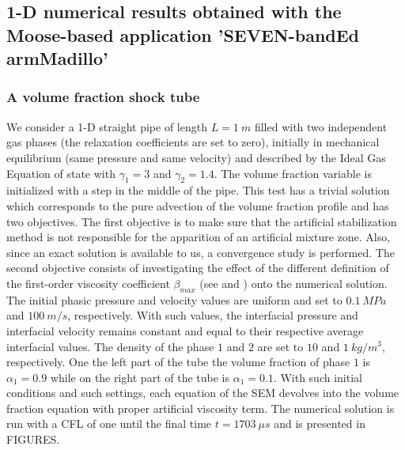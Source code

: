 \documentclass[preprint,10pt]{elsarticle}
\begin{document}
\subsection{1-D numerical results obtained with the Moose-based application 'SEVEN-bandEd armMadillo'}\label{sec:1d-results-sba}
%
\subsubsection{A volume fraction shock tube}\label{sec:vf-advection-test}
%
We consider a 1-D straight pipe of length $L=1 \ m$ filled with two independent gas phases (the relaxation coefficients are set to zero), initially in mechanical 
equilibrium (same pressure and same velocity) and described by the Ideal Gas Equation of state with $\gamma_1 = 3$ and $\gamma_2 = 1.4$. The volume 
fraction variable is initialized with a step in the middle of the pipe. This test has a trivial solution which corresponds to the pure advection of the volume fraction 
profile and has two objectives. The first objective is to make sure that the artificial stabilization method is not responsible for the apparition of an artificial 
mixture zone. Also, since an exact solution is available to us, a convergence study is performed. The second objective consists of investigating the effect of the 
different definition of the first-order viscosity coefficient $\beta_{max}$ (see  and ) onto the numerical 
solution.
The initial phasic pressure and velocity values are uniform and set to $0.1 \ MPa$ and $100 \ m/s$, respectively. With such values, the interfacial pressure and 
interfacial velocity remains constant and equal to their respective average interfacial values. The density of the phase $1$ and $2$ are set to $10$ and $1 \ kg/
m^3$, respectively. One the left part of the tube the volume fraction of phase $1$ is $\alpha_1 = 0.9$ while on the right part of the tube is $\alpha_1=0.1$. With 
such initial conditions and such settings, each equation of the SEM devolves into the volume fraction equation with proper artificial viscosity term. The 
numerical solution is run with a CFL of one until the final time $t=1703 \ \mu s$ and is presented in FIGURES.
%
\end{document}
